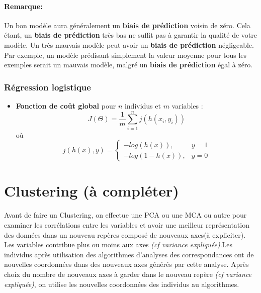 \documentclass[french]{article}
\begin{document}
\paragraph{Remarque:}
Un bon modèle aura généralement un \textbf{biais de prédiction} voisin de zéro. Cela étant, un \textbf{biais de prédiction} très bas ne suffit pas à garantir la qualité de votre modèle. Un très mauvais modèle peut avoir un \textbf{biais de prédiction} négligeable. Par exemple, un modèle prédisant simplement la valeur moyenne pour tous les exemples serait un mauvais modèle, malgré un \textbf{biais de prédiction} égal à zéro.

	\subsubsection{Régression logistique}
	\begin{itemize}[label=\textbullet, font=\LARGE \color{red}]
			\item \textbf{Fonction de coût global} pour $n$ individus et $m$ variables : $$
			J(\Theta)=\frac{1}{m}\sum_{i=1}^{n}j(h(x_{i},y_{i}))$$
			où $$j(h(x),y)=\left\{
			\begin{array}{ll}
			-log(h(x)), & y=1 \\
			-log(1-h(x)), & y=0
			\end{array}
			\right.
			$$
	\end{itemize}

\newpage
	
	
\section{Clustering (à compléter)}
	
	Avant de faire un Clustering, on effectue une PCA ou une MCA ou autre pour examiner les corrélations entre les variables et avoir une meilleur représentation des données dans un nouveau repères composé de nouveaux axes(à expliciter). Les variables contribue plus ou moins aux axes \textit{(cf variance expliquée)}.Les individus après utilisation des algorithmes d'analyses des correspondances ont de nouvelles coordonnées dans des nouveaux axes générés par cette analyse. Après choix du nombre de nouveaux axes à garder dans le nouveau repère \textit{(cf variance expliquée)}, on utilise les nouvelles coordonnées des individus au algorithmes.\\
\end{document}
